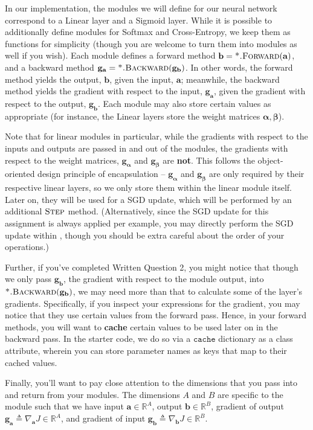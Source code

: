 \documentclass[11pt,addpoints,answers]{exam}
\newcommand{\Rb}{\mathbb{R}}
\newcommand{\av}{\mathbf{a}}
\newcommand{\bv}{\mathbf{b}}
\newcommand{\gv}{\mathbf{g}}
\newcommand{\alphav     }{\boldsymbol \alpha     }
\newcommand{\betav      }{\boldsymbol \beta      }
\begin{document}
In our implementation, the modules we will define for our neural network correspond to a Linear layer and a Sigmoid layer. While it is possible to additionally define modules for Softmax and Cross-Entropy, we keep them as functions for simplicity (though you are welcome to turn them into modules as well if you wish). Each module defines a forward method $\bv = \textproc{*.Forward}(\av)$, and a backward method $\gv_{\av} = \textproc{*.Backward}(\gv_{\bv})$. In other words, the forward method yields the output, $\bv$, given the input, $\av$; meanwhile, the backward method yields the gradient with respect to the input, $\gv_{\av}$, given the gradient with respect to the output, $\gv_{\bv}$. Each module may also store certain values as appropriate (for instance, the Linear layers store the weight matrices $\alphav, \betav$).

Note that for linear modules in particular, while the gradients with respect to the inputs and outputs are passed in and out of the modules, the gradients with respect to the weight matrices, $\gv_{\alphav}$ and $\gv_{\betav}$ are \textbf{not}. This follows the object-oriented design principle of encapsulation -- $\gv_{\alphav}$ and $\gv_{\betav}$ are only required by their respective linear layers, so we only store them within the linear module itself. Later on, they will be used for a SGD update, which will be performed by an additional $\textproc{Step}$ method. (Alternatively, since the SGD update for this assignment is always applied per example, you may directly perform the SGD update within , though you should be extra careful about the order of your operations.)

Further, if you've completed Written Question 2, you might notice that though we only pass $\gv_{\bv}$, the gradient with respect to the module output, into $\textproc{*.Backward}(\gv_{\bv})$, we may need more than that to calculate some of the layer's gradients. Specifically, if you inspect your expressions for the gradient, you may notice that they use certain values from the forward pass. Hence, in your forward methods, you will want to \textbf{cache} certain values to be used later on in the backward pass. In the starter code, we do so via a $\texttt{cache}$ dictionary as a class attribute, wherein you can store parameter names as keys that map to their cached values.

Finally, you’ll want to pay close attention to the dimensions that you pass into and return from your modules. The dimensions $A$ and $B$ are specific to the module such that we have input $\av \in \Rb^A$, output $\bv \in \Rb^B$, gradient of output $\gv_{\av} \triangleq \nabla_{\av}J \in \Rb^A$, and gradient of input $\gv_{\bv} \triangleq \nabla_{\bv}J \in \Rb^B$. 
\end{document}

